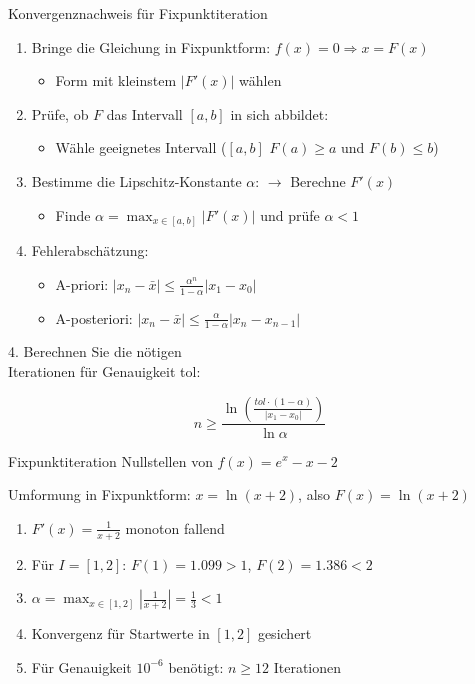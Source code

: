 \begin{KR}{Konvergenznachweis für Fixpunktiteration}
\begin{enumerate}
    \item Bringe die Gleichung in Fixpunktform: $f(x)=0 \Rightarrow x = F(x)$
    \begin{itemize}
        \item Form mit kleinstem $|F'(x)|$ wählen
    \end{itemize}
    \item Prüfe, ob $F$ das Intervall $[a,b]$ in sich abbildet:
    \begin{itemize}
        \item Wähle geeignetes Intervall ($[a,b]$ $F(a) \geq a$ und $F(b) \leq b$)
    \end{itemize}
    \item Bestimme die Lipschitz-Konstante $\alpha$: $\rightarrow$ Berechne $F'(x)$
    \begin{itemize}
        \item Finde $\alpha = \max_{x \in [a,b]} |F'(x)|$ und prüfe $\alpha < 1$
    \end{itemize}
    \item Fehlerabschätzung:
    \begin{itemize}
        \item A-priori: $|x_n-\bar{x}| \leq \frac{\alpha^n}{1-\alpha}|x_1-x_0|$
        \item A-posteriori: $|x_n-\bar{x}| \leq \frac{\alpha}{1-\alpha}|x_n-x_{n-1}|$
    \end{itemize}
\end{enumerate}

\begin{minipage}[t]{0.5\textwidth}
    4. Berechnen Sie die nötigen \\Iterationen für Genauigkeit tol:
\end{minipage}
\begin{minipage}[t]{0.4\textwidth}
    \vspace{-3mm}
$$n \geq \frac{\ln(\frac{tol \cdot (1-\alpha)}{|x_1-x_0|})}{\ln \alpha}$$
\end{minipage}
\end{KR}

\begin{example2}{Fixpunktiteration} Nullstellen von $f(x)=e^x - x - 2$

Umformung in Fixpunktform: $x = \ln(x+2)$, also $F(x)=\ln(x+2)$
\begin{enumerate}
    \item $F'(x) = \frac{1}{x+2}$ monoton fallend
    \item Für $I=[1,2]$: $F(1)=1.099 > 1$, $F(2)=1.386 < 2$
    \item $\alpha = \max_{x \in [1,2]} |\frac{1}{x+2}| = \frac{1}{3} < 1$
    \item Konvergenz für Startwerte in $[1,2]$ gesichert
    \item Für Genauigkeit $10^{-6}$ benötigt: $n \geq 12$ Iterationen
\end{enumerate}
\end{example2}


